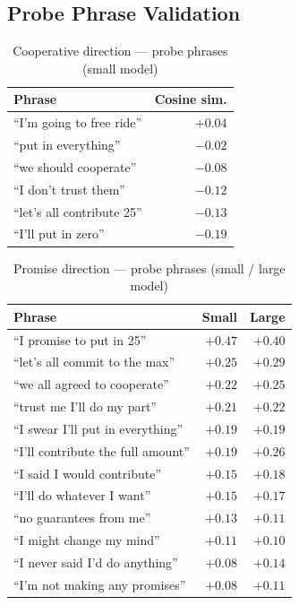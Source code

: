 \documentclass[11pt,oneside]{article}
\begin{document}
\subsection{Probe Phrase Validation}

\begin{table}[H]
\centering
\caption{Cooperative direction --- probe phrases (small model)}
\label{tab:probe_coop}
\footnotesize
\begin{tabular}{lr}
\toprule
Phrase & Cosine sim. \\
\midrule
``I'm going to free ride'' & $+0.04$ \\
``put in everything'' & $-0.02$ \\
``we should cooperate'' & $-0.08$ \\
``I don't trust them'' & $-0.12$ \\
``let's all contribute 25'' & $-0.13$ \\
``I'll put in zero'' & $-0.19$ \\
\bottomrule
\end{tabular}
\end{table}

\begin{table}[H]
\centering
\caption{Promise direction --- probe phrases (small / large model)}
\label{tab:probe_promise}
\footnotesize
\begin{tabular}{lrr}
\toprule
Phrase & Small & Large \\
\midrule
``I promise to put in 25'' & $+0.47$ & $+0.40$ \\
``let's all commit to the max'' & $+0.25$ & $+0.29$ \\
``we all agreed to cooperate'' & $+0.22$ & $+0.25$ \\
``trust me I'll do my part'' & $+0.21$ & $+0.22$ \\
``I swear I'll put in everything'' & $+0.19$ & $+0.19$ \\
``I'll contribute the full amount'' & $+0.19$ & $+0.26$ \\
``I said I would contribute'' & $+0.15$ & $+0.18$ \\
``I'll do whatever I want'' & $+0.15$ & $+0.17$ \\
``no guarantees from me'' & $+0.13$ & $+0.11$ \\
``I might change my mind'' & $+0.11$ & $+0.10$ \\
``I never said I'd do anything'' & $+0.08$ & $+0.14$ \\
``I'm not making any promises'' & $+0.08$ & $+0.11$ \\
\bottomrule
\end{tabular}
\end{table}
\end{document}
